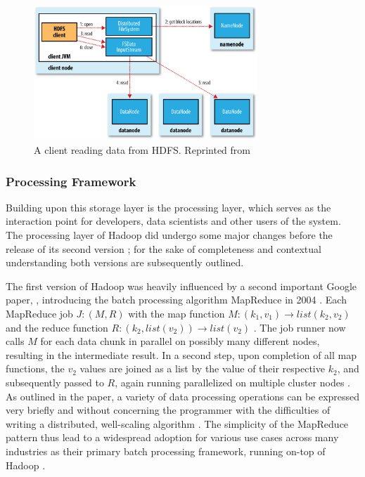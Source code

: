 \begin{figure}[th]
     {\centering\includegraphics[width=0.75\textwidth]{img/hddg_0302.png}\par}
	\caption{\label{fig:hdfs_read}A client reading data from HDFS. Reprinted from \autocite[][Chap.~3]{white2015hadoop}}
\end{figure}

\subsubsection{Processing Framework}

Building upon this storage layer is the processing layer, which serves as the interaction point for developers, data scientists and other users of the system. The processing layer of Hadoop did undergo some major changes before the release of its second version \autocite[p.~5]{vavilapalli2013apache}; for the sake of completeness and contextual understanding both versions are subsequently outlined.

The first version of Hadoop was heavily influenced by a second important Google paper, \textcite[p.~82]{rajasekar2015survey}, introducing the batch processing algorithm MapReduce in 2004 \autocite{dean2004mapreduce}. Each MapReduce job $J: (M, R)$ with the map function $M: (k_1, v_1) \rightarrow list(k_2, v_2)$ and the reduce function $R: (k_2, list(v_2)) \rightarrow list(v_2)$ \autocite[p.~6]{dean2004mapreduce}. The job runner now calls $M$ for each data chunk in parallel on possibly many different nodes, resulting in the intermediate result. In a second step, upon completion of all map functions, the $v_2$ values are joined as a list by the value of their respective $k_2$, and subsequently passed to $R$, again running parallelized on multiple cluster nodes \autocite[p.~6]{dean2004mapreduce}. As outlined in the paper, a variety of data processing operations can be expressed very briefly and without concerning the programmer with the difficulties of writing a distributed, well-scaling algorithm \autocite[p.~6]{dean2004mapreduce}. The simplicity of the MapReduce pattern thus lead to a widespread adoption for various use cases across many industries as their primary batch processing framework, running on-top of Hadoop \autocite[p.~82]{rajasekar2015survey}.

